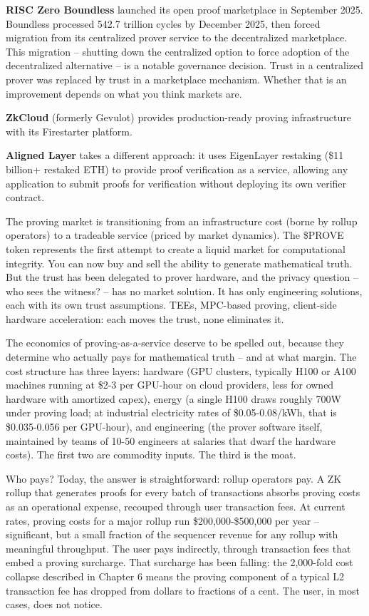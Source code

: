 \documentclass[
  11pt,
  openany]{report}
\renewcommand{\textbf}[1]{{\bfseries\color{MidnightBold}#1}}
\begin{document}
\textbf{RISC Zero Boundless} launched its open proof marketplace in September
2025. Boundless processed 542.7 trillion cycles by December 2025, then forced
migration from its centralized prover service to the decentralized marketplace.
This migration -- shutting down the centralized option to force adoption of the
decentralized alternative -- is a notable governance decision. Trust in a
centralized prover was replaced by trust in a marketplace mechanism. Whether
that is an improvement depends on what you think markets are.

\textbf{ZkCloud} (formerly Gevulot) provides production-ready proving
infrastructure with its Firestarter platform.

\textbf{Aligned Layer} takes a different approach: it uses EigenLayer restaking
(\$11 billion+ restaked ETH) to provide proof verification as a service,
allowing any application to submit proofs for verification without deploying its
own verifier contract.

The proving market is transitioning from an infrastructure cost (borne by rollup
operators) to a tradeable service (priced by market dynamics). The \$PROVE token
represents the first attempt to create a liquid market for computational
integrity. You can now buy and sell the ability to generate mathematical truth.
But the trust has been delegated to prover hardware, and the privacy question --
who sees the witness? -- has no market solution. It has only engineering
solutions, each with its own trust assumptions. TEEs, MPC-based proving,
client-side hardware acceleration: each moves the trust, none eliminates it.

The economics of proving-as-a-service deserve to be spelled out, because they
determine who actually pays for mathematical truth -- and at what margin. The
cost structure has three layers: hardware (GPU clusters, typically H100 or A100
machines running at \$2-3 per GPU-hour on cloud providers, less for owned
hardware with amortized capex), energy (a single H100 draws roughly 700W under
proving load; at industrial electricity rates of \$0.05-0.08/kWh, that is
\$0.035-0.056 per GPU-hour), and engineering (the prover software itself,
maintained by teams of 10-50 engineers at salaries that dwarf the hardware
costs). The first two are commodity inputs. The third is the moat.

Who pays? Today, the answer is straightforward: rollup operators pay. A ZK
rollup that generates proofs for every batch of transactions absorbs proving
costs as an operational expense, recouped through user transaction fees. At
current rates, proving costs for a major rollup run \$200,000-\$500,000 per year
-- significant, but a small fraction of the sequencer revenue for any rollup
with meaningful throughput. The user pays indirectly, through transaction fees
that embed a proving surcharge. That surcharge has been falling: the 2,000-fold
cost collapse described in Chapter 6 means the proving component of a typical L2
transaction fee has dropped from dollars to fractions of a cent. The user, in
most cases, does not notice.
\end{document}
